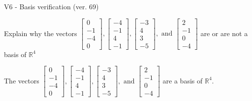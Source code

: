 \begin{exercise}
  \begin{exerciseTitle}V6 - Basis verification (ver. 69)\end{exerciseTitle}
  \begin{exerciseStatement}
    Explain why the vectors \(\left[\begin{array}{r}
0 \\
-1 \\
-4 \\
0
\end{array}\right] , \left[\begin{array}{r}
-4 \\
-1 \\
4 \\
-1
\end{array}\right] , \left[\begin{array}{r}
-3 \\
4 \\
3 \\
-5
\end{array}\right] , \text{ and } \left[\begin{array}{r}
2 \\
-1 \\
0 \\
-4
\end{array}\right]\) are or are not a basis of \(\mathbb{R}^4\)	


  \end{exerciseStatement}
  \begin{exerciseAnswer}
   The vectors \(\left[\begin{array}{r}
0 \\
-1 \\
-4 \\
0
\end{array}\right] , \left[\begin{array}{r}
-4 \\
-1 \\
4 \\
-1
\end{array}\right] , \left[\begin{array}{r}
-3 \\
4 \\
3 \\
-5
\end{array}\right] , \text{ and } \left[\begin{array}{r}
2 \\
-1 \\
0 \\
-4
\end{array}\right]\) 
  	 are  a basis of \(\mathbb{R}^4\).
  


  \end{exerciseAnswer}
\end{exercise}